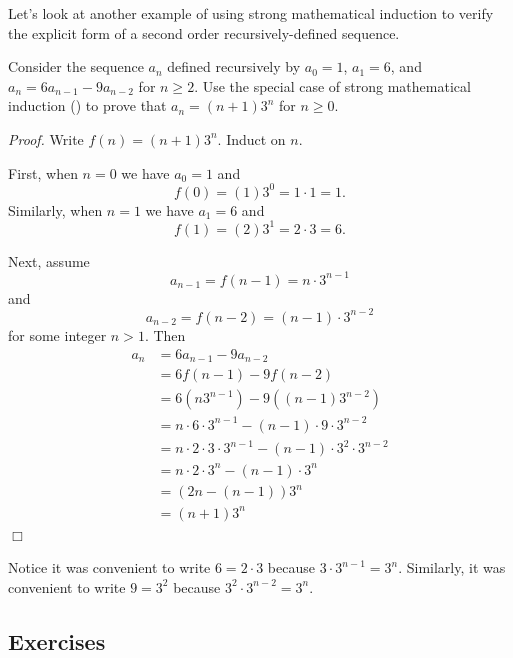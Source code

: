 Let's look at another example of using strong mathematical induction to verify the explicit form of a second order recursively-defined sequence.

\begin{exam} 
\label{exam_strong_math_ind_explicit}
    Consider the sequence $a_n$ defined recursively by $a_0= 1$, $a_1 =6$, and $a_n =6a_{n-1} -9a_{n-2}$ for $ n \ge 2$.   Use the special case of strong mathematical induction () to prove that $a_n = (n+1)3^n$ for $n \ge 0$.
        \begin{soln}
            \emph{Proof.} Write $f(n) = (n+1)3^n$. Induct on $n$.

            First, when $n=0$ we have $a_0=1$ and $$f(0)=(1)3^0=1\cdot 1 = 1.$$  Similarly, when $n=1$ we have $a_1=6$ and $$f(1)=(2)3^1= 2\cdot 3 = 6.$$

            Next, assume $$a_{n-1}=f(n-1)=n\cdot 3^{n-1}$$ and $$a_{n-2}=f(n-2)=(n-1)\cdot 3^{n-2}$$ for some integer $n > 1$.  Then
                \begin{align*}
                    a_n & = 6a_{n-1} -9a_{n-2} \\
                    & = 6f(n-1)-9f(n-2) \\
                    & = 6\left(n3^{n-1}\right) -9\left((n-1)3^{n-2}\right) \\
                    & = n\cdot 6\cdot 3^{n-1}- (n-1)\cdot 9 \cdot 3^{n-2} \\
                    & = n\cdot 2 \cdot 3 \cdot 3^{n-1}- (n-1)\cdot 3^2 \cdot 3^{n-2} \\ 
                    & = n\cdot 2 \cdot 3^n- (n-1) \cdot 3^n \\ 
                    & =(2n-(n-1))3^n \\
                    & = (n+1)3^n 
                \end{align*}
            \hfill $\Box$
            
            Notice it was convenient to write $6=2\cdot 3$ because $3 \cdot 3^{n-1} = 3^n$. Similarly, it was convenient to write $9 = 3^2$ because $3^2\cdot3^{n-2}=3^n$.
        \end{soln}
\end{exam}


\subsection{Exercises}

